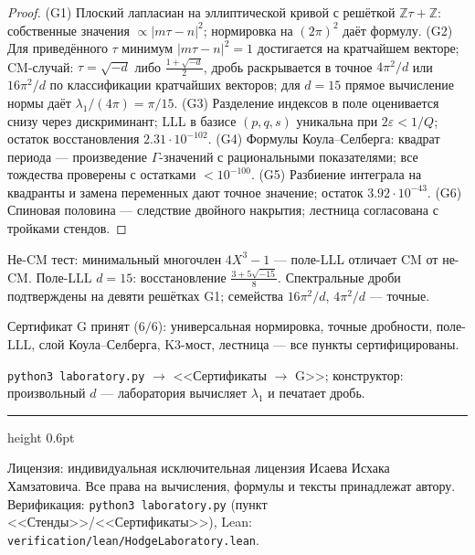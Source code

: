 \documentclass[11pt,a4paper]{article}
\theoremstyle{plain}
\theoremstyle{definition}
\theoremstyle{remark}
\newcommand{\ZZ}{\mathbb{Z}}
\newcommand{\Ga}{\Gamma}
\begin{document}
\begin{proof}
(G1) Плоский лапласиан на эллиптической кривой с решёткой
$\ZZ\tau+\ZZ$: собственные значения $\propto|m\tau-n|^2$;
нормировка на $(2\pi)^2$ даёт формулу.
(G2) Для приведённого $\tau$ минимум $|m\tau-n|^2=1$ достигается на
кратчайшем векторе; CM-случай: $\tau=\sqrt{-d}$ либо
$\frac{1+\sqrt{-d}}2$, дробь раскрывается в точное $4\pi^2/d$ или
$16\pi^2/d$ по классификации кратчайших векторов; для $d=15$
прямое вычисление нормы даёт $\lambda_1/(4\pi)=\pi/15$.
(G3) Разделение индексов в поле оценивается снизу через
дискриминант; LLL в базисе $(p,q,s)$ уникальна при
$2\varepsilon<1/Q$; остаток восстановления $2.31\cdot10^{-102}$.
(G4) Формулы Коула--Селберга: квадрат периода --- произведение
$\Ga$-значений с рациональными показателями; все тождества
проверены с остатками $<10^{-100}$.
(G5) Разбиение интеграла на квадранты и замена переменных дают
точное значение; остаток $3.92\cdot10^{-43}$.
(G6) Спиновая половина --- следствие двойного накрытия; лестница
согласована с тройками стендов.
\end{proof}

\begin{databox}[числа]
Не-CM тест: минимальный многочлен $4X^3-1$ --- поле-LLL отличает
CM от не-CM. Поле-LLL $d=15$: восстановление
$\frac{3+5\sqrt{-15}}8$. Спектральные дроби подтверждены на девяти
решётках G1; семейства $16\pi^2/d$, $4\pi^2/d$ --- точные.
\end{databox}

\begin{statusbox}[итог]
Сертификат G принят ($6/6$): универсальная нормировка, точные
дробности, поле-LLL, слой Коула--Селберга, K3-мост, лестница ---
все пункты сертифицированы.
\end{statusbox}

\begin{verifybox}
\texttt{python3 laboratory.py} $\to$ <<Сертификаты $\to$ G>>;
конструктор: произвольный $d$ --- лаборатория вычисляет
$\lambda_1$ и печатает дробь.
\end{verifybox}

\vfill
{\color{linkblue}\hrule height 0.6pt}
\vspace{0.5em}
{\small\color{gray}
Лицензия: индивидуальная исключительная лицензия Исаева Исхака Хамзатовича.
Все права на вычисления, формулы и тексты принадлежат автору.
Верификация: \texttt{python3 laboratory.py} (пункт <<Стенды>>/<<Сертификаты>>),
Lean: \texttt{verification/lean/HodgeLaboratory.lean}.
}
\end{document}

